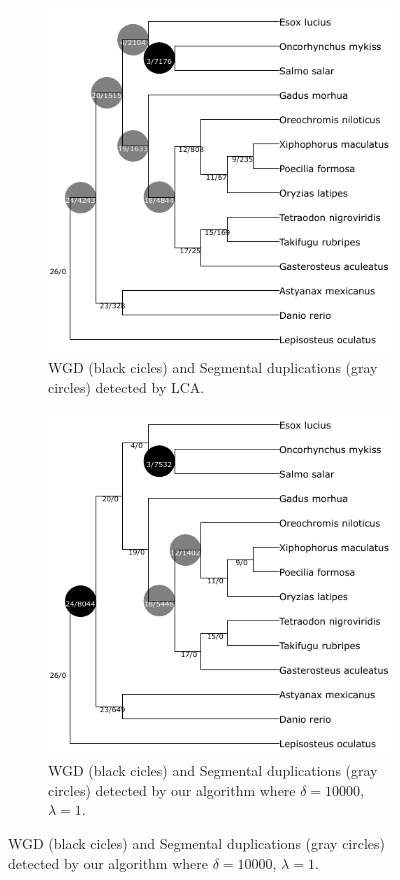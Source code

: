 \documentclass[10pt]{article}
\begin{document}
\begin{figure}[h!]
    \centering

    \begin{subfigure}[b]{0.48\textwidth}
        \centering
        \includegraphics[scale=0.7]{figs/salmon_lca.pdf} %
        \caption{WGD (black cicles) and Segmental duplications (gray circles) detected by LCA.}
        \label{fig:salmon-lca}
    \end{subfigure}
    \hfill
    \begin{subfigure}[b]{0.48\textwidth}
        \centering
        \includegraphics[scale=0.7]{figs/salmon_greedy10000.pdf} %
        \caption{WGD (black cicles) and Segmental duplications (gray circles) detected by our algorithm where $\delta=10000$, $\lambda=1$.}
        \label{fig:salmon-greedy}
    \end{subfigure}
    

\end{figure}
\end{document}
